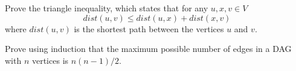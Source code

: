 \documentclass[solution, letterpaper]{cs20inclass}
\begin{document}
\problem Prove the triangle inequality, which states that for any $u, x, v \in V$
\[dist(u, v) \le dist(u, x) + dist(x, v)\]
where $dist(u,v)$ is the shortest path between the vertices $u$ and $v$.

\begin{solution}

 
\end{solution}

\problem Prove using induction that the maximum possible number of edges in a DAG with $n$ vertices is $n(n-1)/2$. 


\begin{solution}

\end{solution}
\end{document}

